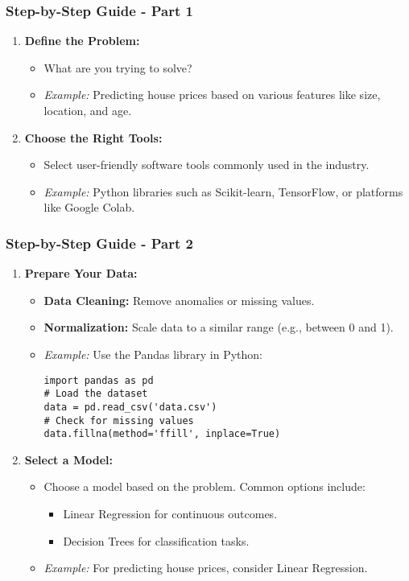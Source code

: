 \documentclass[aspectratio=169]{beamer}
\begin{document}
\begin{frame}[fragile]
    \frametitle{Step-by-Step Guide - Part 1}
    \begin{enumerate}
        \item \textbf{Define the Problem:}
        \begin{itemize}
            \item What are you trying to solve?
            \item \textit{Example:} Predicting house prices based on various features like size, location, and age.
        \end{itemize}
        
        \item \textbf{Choose the Right Tools:}
        \begin{itemize}
            \item Select user-friendly software tools commonly used in the industry.
            \item \textit{Example:} Python libraries such as Scikit-learn, TensorFlow, or platforms like Google Colab.
        \end{itemize}
    \end{enumerate}
\end{frame}

\begin{frame}[fragile]
    \frametitle{Step-by-Step Guide - Part 2}
    \begin{enumerate}[resume]
        \item \textbf{Prepare Your Data:}
        \begin{itemize}
            \item \textbf{Data Cleaning:} Remove anomalies or missing values.
            \item \textbf{Normalization:} Scale data to a similar range (e.g., between 0 and 1).
            \item \textit{Example:} Use the Pandas library in Python:
            \begin{lstlisting}
import pandas as pd
# Load the dataset
data = pd.read_csv('data.csv')
# Check for missing values
data.fillna(method='ffill', inplace=True)
            \end{lstlisting}
        \end{itemize}
        
        \item \textbf{Select a Model:}
        \begin{itemize}
            \item Choose a model based on the problem. Common options include:
            \begin{itemize}
                \item Linear Regression for continuous outcomes.
                \item Decision Trees for classification tasks.
            \end{itemize}
            \item \textit{Example:} For predicting house prices, consider Linear Regression.
        \end{itemize}
    \end{enumerate}
\end{frame}
\end{document}
